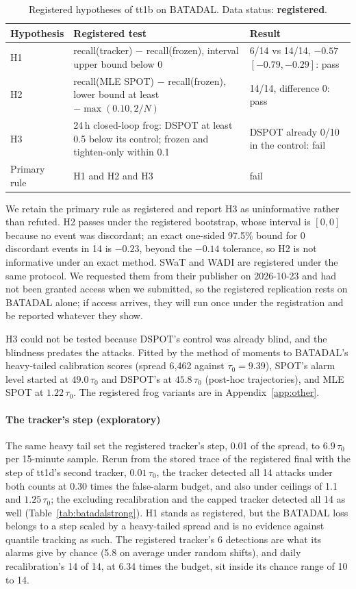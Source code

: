 \documentclass[sigconf]{acmart}
\begin{document}
\begin{table}[t]
\caption{Registered hypotheses of tt1b on BATADAL. Data status: \textbf{registered}.}
\label{tab:tt1b}
\begin{tabular}{@{}p{}p{}p{}@{}}
\toprule
Hypothesis & Registered test & Result \\
\midrule
H1 & recall(tracker) $-$ recall(frozen), interval upper bound below 0 & 6/14 vs 14/14, $-0.57$ $[-0.79, -0.29]$: pass \\
H2 & recall(MLE SPOT) $-$ recall(frozen), lower bound at least $-\max(0.10, 2/N)$ & 14/14, difference 0: pass \\
H3 & 24\,h closed-loop frog: DSPOT at least 0.5 below its control; frozen and tighten-only within 0.1 & DSPOT already 0/10 in the control: fail \\
Primary rule & H1 and H2 and H3 & fail \\
\bottomrule
\end{tabular}
\end{table}

We retain the primary rule as registered and report H3 as uninformative rather than refuted. H2
passes under the registered bootstrap, whose interval is $[0, 0]$ because no event was discordant; an
exact one-sided 97.5\% bound for 0 discordant events in 14 is $-0.23$, beyond the $-0.14$ tolerance,
so H2 is not informative under an exact method. SWaT and WADI are registered under the same protocol.
We requested them from their publisher on 2026-10-23 and had not been granted access when we
submitted, so the registered replication rests on BATADAL alone; if access arrives, they will run once
under the registration and be reported whatever they show.

H3 could not be tested because DSPOT's control was already blind, and the blindness predates the
attacks. Fitted by the method of moments to BATADAL's heavy-tailed calibration scores (spread 6,462
against $\tau_0 = 9.39$), SPOT's alarm level started at $49.0\,\tau_0$ and DSPOT's at $45.8\,\tau_0$
(post-hoc trajectories), and MLE SPOT at
$1.22\,\tau_0$. The registered frog variants are in Appendix~\ref{app:other}.

\paragraph{The tracker's step (exploratory)}
The same heavy tail set the registered tracker's step, 0.01 of the spread, to $6.9\,\tau_0$ per
15-minute sample. Rerun from the stored trace of the registered final with the step of tt1d's second
tracker, $0.01\,\tau_0$, the tracker detected all 14 attacks under both counts at 0.30 times the
false-alarm budget, and also under ceilings of 1.1 and $1.25\,\tau_0$; the excluding recalibration and
the capped tracker detected all 14 as well (Table~\ref{tab:batadalstrong}). H1 stands as registered, but
the BATADAL loss belongs to a step scaled by a heavy-tailed spread and is no evidence against quantile
tracking as such. The registered tracker's 6 detections are what its alarms give by chance
(5.8 on average under random shifts), and daily recalibration's 14 of 14, at 6.34 times the budget,
sit inside its chance range of 10 to 14.
\end{document}
